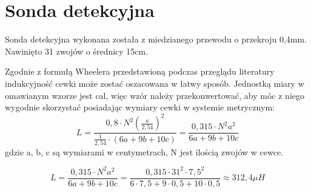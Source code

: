 \section{Sonda detekcyjna}
Sonda detekcyjna wykonana została z miedzianego przewodu o przekroju 0,4mm. Nawinięto 31 zwojów o średnicy 15cm.

Zgodnie z formułą Wheelera przedstawioną podczas przeglądu literatury indukcyjność cewki może zostać oszacowana w łatwy sposób. Jednostką miary w omawianym wzorze jest cal, więc wzór należy przekonwertować, aby móc z niego wygodnie skorzystać posiadając wymiary cewki w systemie metrycznym:
\begin{equation}
    L = \frac{0,8\cdot N^2 (\frac{a}{2,54})^2}{\frac{1}{2,54}\cdot(6a + 9b + 10c)}=\frac{0,315 \cdot N^2 a^2}{6a + 9b + 10c}
    \label{eq:cewka_id}
\end{equation}
gdzie a, b, c są wymiarami w centymetrach, N jest ilością zwojów w cewce.

\begin{equation}
    L=\frac{0,315 \cdot N^2 a^2}{6a + 9b + 10c}=\frac{0,315 \cdot 31^2 \cdot 7,5^2}{6 \cdot 7,5 + 9 \cdot 0,5 + 10 \cdot 0,5} \approx 312,4 \mu H
    \label{eq:cewka_obl}
\end{equation}

